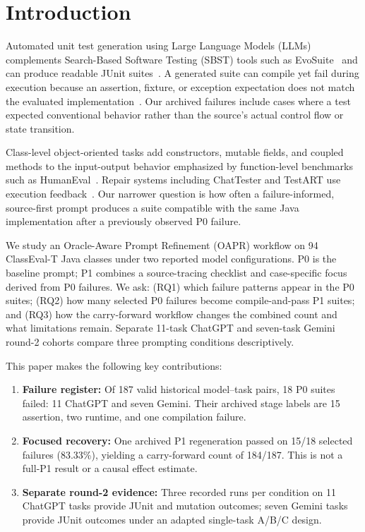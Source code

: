 \section{Introduction}
\label{sec:introduction}

Automated unit test generation using Large Language Models (LLMs) complements Search-Based Software Testing (SBST) tools such as EvoSuite~\cite{fraser2011evosuite} and can produce readable JUnit suites~\cite{schafer2024empirical,alshahwan2024meta}. A generated suite can compile yet fail during execution because an assertion, fixture, or exception expectation does not match the evaluated implementation~\cite{yuan2024chattester,gu2024testart,konstantinou2025yate}. Our archived failures include cases where a test expected conventional behavior rather than the source's actual control flow or state transition.

Class-level object-oriented tasks add constructors, mutable fields, and coupled methods to the input-output behavior emphasized by function-level benchmarks such as HumanEval~\cite{chen2021humaneval,siddiq2024junit,du2024classeval,xue2025classevalt}. Repair systems including ChatTester and TestART use execution feedback~\cite{yuan2024chattester,gu2024testart}. Our narrower question is how often a failure-informed, source-first prompt produces a suite compatible with the same Java implementation after a previously observed P0 failure.

We study an Oracle-Aware Prompt Refinement (OAPR) workflow on 94 ClassEval-T Java classes under two reported model configurations. P0 is the baseline prompt; P1 combines a source-tracing checklist and case-specific focus derived from P0 failures. We ask: (RQ1) which failure patterns appear in the P0 suites; (RQ2) how many selected P0 failures become compile-and-pass P1 suites; and (RQ3) how the carry-forward workflow changes the combined count and what limitations remain. Separate 11-task ChatGPT and seven-task Gemini round-2 cohorts compare three prompting conditions descriptively.

This paper makes the following key contributions:
\begin{enumerate}
    \item \textbf{Failure register:} Of 187 valid historical model--task pairs, 18 P0 suites failed: 11 ChatGPT and seven Gemini. Their archived stage labels are 15 assertion, two runtime, and one compilation failure.
    \item \textbf{Focused recovery:} One archived P1 regeneration passed on 15/18 selected failures (83.33\%), yielding a carry-forward count of 184/187. This is not a full-P1 result or a causal effect estimate.
    \item \textbf{Separate round-2 evidence:} Three recorded runs per condition on 11 ChatGPT tasks provide JUnit and mutation outcomes; seven Gemini tasks provide JUnit outcomes under an adapted single-task A/B/C design.
\end{enumerate}

